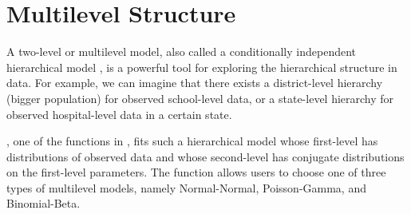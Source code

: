 \documentclass[article]{jss}
\begin{document}

\section[Multilevel Structure]{Multilevel Structure} \label{multilevel}
A two-level or multilevel model, also called a conditionally independent hierarchical model \citep{1989}, is a powerful tool for exploring the hierarchical structure in data. For example, we can imagine that there exists a district-level hierarchy (bigger population) for observed school-level data, or a state-level hierarchy for observed hospital-level data in a certain state. 

, one of the functions in , fits such a hierarchical model whose first-level has distributions of observed data and whose second-level has conjugate distributions on the first-level parameters. The  function allows users to choose one of three types of multilevel models, namely Normal-Normal, Poisson-Gamma, and Binomial-Beta. 
 
\end{document}
